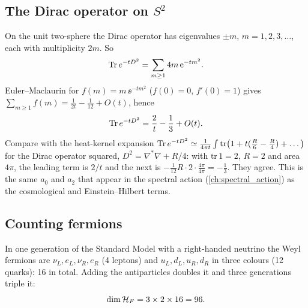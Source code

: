 \subsection{The Dirac operator on $S^2$}
On the unit two-sphere the Dirac operator has eigenvalues $\pm m$, $m=1,2,3,\dots$, each with multiplicity $2m$. So
\begin{equation}
\operatorname{Tr} e^{-tD^2}=\sum_{m\ge1}4m\,\mathrm{e}^{-tm^2}.
\end{equation}
Euler--Maclaurin for $f(m)=m\,\ee^{-tm^2}$ ($f(0)=0$, $f'(0)=1$) gives $\sum_{m\ge1}f(m)=\frac1{2t}-\frac1{12}+O(t)$, hence
\begin{equation}
\operatorname{Tr} e^{-tD^2}=\frac2t-\frac13+O(t).
\end{equation}
Compare with the heat-kernel expansion $\operatorname{Tr} e^{-tD^2}\simeq\frac1{4\pi t}\int\mathrm{tr}\big(1+t(\tfrac R6-\tfrac R4)+\dots\big)$ for the Dirac operator squared, $D^2=\nabla^*\nabla+R/4$: with $\mathrm{tr}\,1=2$, $R=2$ and area $4\pi$, the leading term is $2/t$ and the next is $-\frac1{12}R\cdot2\cdot\frac{4\pi}{4\pi}=-\frac13$. They agree. This is the same $a_0$ and $a_2$ that appear in the spectral action (\cref{ch:spectral_action}) as the cosmological and Einstein--Hilbert terms.

\subsection{Counting fermions}
In one generation of the Standard Model with a right-handed neutrino the Weyl fermions are $\nu_L,e_L,\nu_R,e_R$ (4 leptons) and $u_L,d_L,u_R,d_R$ in three colours (12 quarks): 16 in total. Adding the antiparticles doubles it and three generations triple it:
\begin{equation}
\dim\mathcal{H}_F=3\times2\times16=96.
\end{equation}

